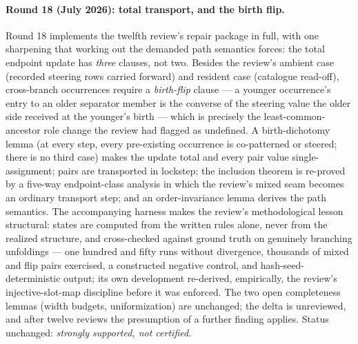 \documentclass[
]{ceurart}
\theoremstyle{definition}
\begin{document}
\paragraph{Round 18 (July 2026): total transport, and the birth flip.}
Round 18 implements the twelfth review's repair package in full, with
one sharpening that working out the demanded path semantics forces: the
total endpoint update has \emph{three} clauses, not two.  Besides the
review's ambient case (recorded steering rows carried forward) and
resident case (catalogue read-off), cross-branch occurrences require a
\emph{birth-flip} clause --- a younger occurrence's entry to an older
separator member is the converse of the steering value the older side
received at the younger's birth --- which is precisely the
least-common-ancestor role change the review had flagged as undefined.
A birth-dichotomy lemma (at every step, every pre-existing occurrence
is co-patterned or steered; there is no third case) makes the update
total and every pair value single-assignment; pairs are transported in
lockstep; the inclusion theorem is re-proved by a five-way
endpoint-class analysis in which the review's mixed seam becomes an
ordinary transport step; and an order-invariance lemma derives the
path semantics.  The accompanying harness makes the review's
methodological lesson structural: states are computed from the written
rules alone, never from the realized structure, and cross-checked
against ground truth on genuinely branching unfoldings --- one hundred
and fifty runs without divergence, thousands of mixed and flip pairs
exercised, a constructed negative control, and hash-seed-deterministic
output; its own development re-derived, empirically, the review's
injective-slot-map discipline before it was enforced.  The two open
completeness lemmas (width budgets, uniformization) are unchanged; the
delta is unreviewed, and after twelve reviews the presumption of a
further finding applies.  Status unchanged: \emph{strongly supported,
not certified}.
\end{document}
